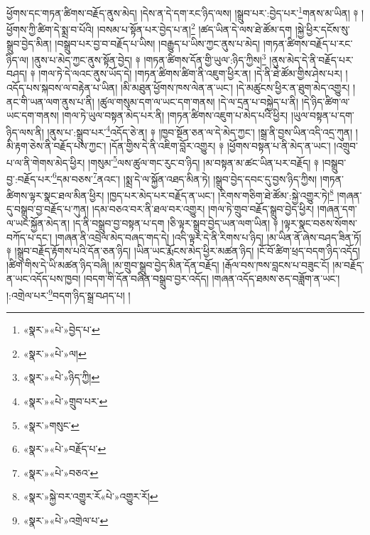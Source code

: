 ཕྱོགས་དང་གཏན་ཚིགས་བརྗོད་ནུས་མེད། །དེས་ན་དེ་དག་རང་ཉིད་ལས། །སྒྲུབ་པར་:བྱེད་པར་\footnote{«སྣར་»«པེ་»བྱེད་པ་}གནས་མ་ཡིན། ༈ །ཕྱོགས་ཀྱི་ཚིག་དེ་སྨྲ་བ་པོའི། །བསམ་པ་སྟོན་པར་བྱེད་པ་ན།\footnote{«སྣར་»«པེ་»ལ།} །ཚད་ཡིན་དེ་ལས་ཐེ་ཚོམ་དག །སྐྱེ་ཕྱིར་དངོས་སུ་སྒྲུབ་བྱེད་མིན། །བསྒྲུབ་པར་བྱ་བ་བརྗོད་པ་ཡིས། །བརྒྱུད་པ་ཡིས་ཀྱང་ནུས་པ་མེད། །གཏན་ཚིགས་བརྗོད་པ་རང་ཉིད་ལ། །ནུས་པ་མེད་ཀྱང་ནུས་སྟོན་བྱེད། ༈ །གཏན་ཚིགས་དོན་གྱི་ཡུལ་:ཉིད་ཀྱིས།\footnote{«སྣར་»«པེ་»ཉིད་ཀྱི།} །ནུས་མེད་དེ་ནི་བརྗོད་པར་བཤད། ༈ །གལ་ཏེ་དེ་ལའང་ནུས་ཡོད་དེ། །གཏན་ཚིགས་ཚིག་ནི་འཇུག་ཕྱིར་ན། །དེ་ནི་ཐེ་ཚོམ་གྱིས་ཤེས་པར། །འདོད་པས་སྐབས་ལ་བརྟེན་པ་ཡིན། །མི་མཐུན་ཕྱོགས་ཁས་ལེན་ན་ཡང་། །དེ་མཚུངས་ཕྱིར་ན་ཐུག་མེད་འགྱུར། །ནང་གི་ཡན་ལག་ནུས་པ་ནི། །ཚུལ་གསུམ་དག་ལ་ཡང་དག་གནས། །དེ་ལ་དྲན་པ་བསྐྱེད་པ་ནི། །དེ་ཉིད་ཚིག་ལ་ཡང་དག་གནས། །གལ་ཏེ་ཡུལ་བསྟན་མེད་པར་ནི། །གཏན་ཚིགས་འཇུག་པ་མེད་པའི་ཕྱིར། །ཡུལ་བསྟན་པ་དག་ཉིད་ལས་ནི། །ནུས་པ་:སྒྲུབ་པར་\footnote{«སྣར་»«པེ་»གྲུབ་པར་}འདོད་ཅེ་ན། ༈ །ཁྱབ་སྔོན་ཅན་ལ་དེ་མེད་ཀྱང་། །སྒྲ་ནི་བྱས་ཡིན་འདི་འདྲ་ཀུན། །མི་རྟག་ཅེས་ནི་བརྗོད་པས་ཀྱང་། །དོན་གྱིས་དེ་ནི་འཇིག་བློར་འགྱུར། ༈ །ཕྱོགས་བསྟན་པ་ནི་མེད་ན་ཡང་། །འགྲུབ་པ་ལ་ནི་གེགས་མེད་ཕྱིར། །གསུམ་\footnote{«སྣར་»གསུང་}ལས་ཚུལ་གང་རུང་བ་ཉིད། །མ་བསྟན་མ་ཚང་ཡིན་པར་བརྗོད། ༈ །བསྒྲུབ་བྱ་:བརྗོད་པར་\footnote{«སྣར་»«པེ་»བརྗོད་པ་}དམ་བཅས་\footnote{«སྣར་»«པེ་»བཅའ་}ནའང་། །སྨྲ་དེ་ལ་སྐྱོན་འཐད་མིན་ཏེ། །སྒྲུབ་བྱེད་དབང་དུ་བྱས་ཉིད་ཀྱིས། །གཏན་ཚིགས་ལྟར་སྣང་ཐལ་མིན་ཕྱིར། །ཁྱད་པར་མེད་པར་བརྗོད་ན་ཡང་། །རིགས་གཅིག་ཐེ་ཚོམ་:སྐྱེ་འགྱུར་ཏེ།\footnote{«སྣར་»སྐྱེ་བར་འགྱུར་རོ«པེ་»འགྱུར་རོ།} །གཞན་དུ་བསྒྲུབ་བྱ་བརྗོད་པ་ཀུན། །དམ་བཅའ་བར་ནི་ཐལ་བར་འགྱུར། །གལ་ཏེ་གྲུབ་བརྗོད་སྒྲུབ་བྱེད་ཕྱིར། །གཞན་དག་ལ་ཡང་སྐྱོན་མེད་ན། །ད་ནི་བསྒྲུབ་བྱ་བསྟན་པ་དག །ཅི་ལྟར་སྒྲུབ་བྱེད་ཡན་ལག་ཡིན། ༈ །ལྟར་སྣང་བཅས་སོགས་བཀོད་པ་དང་། །གཞན་ནི་འབྲེལ་མེད་བཞད་གད་དེ། །འདི་ལྟར་དེ་ནི་རིགས་པ་ཉིད། །མ་ཡིན་ནོ་ཞེས་བཤད་ཟིན་ཏོ། ༈ །སྒྲུབ་བརྗོད་རྟོགས་པའི་དོན་ཅན་ཉིད། །ཡིན་ཡང་རྨོངས་མེད་ཕྱིར་མཚན་ཉིད། །ངོ་བོ་ཚིག་ཕྲད་བདག་ཉིད་འདོད། །ཚིག་གིས་དེ་ཡི་མཚན་ཉིད་བཞི། །མ་གྲུབ་སྒྲུབ་བྱེད་མིན་དོན་བརྗོད། །རྒོལ་བས་ཁས་བླངས་པ་བཟུང་ངོ། །མ་བརྗོད་ན་ཡང་འདོད་པས་ཁྱབ། །བདག་གི་དོན་བཞིན་བསྒྲུབ་བྱར་འདོད། །གཞན་འདོད་ཐམས་ཅད་བཟློག་ན་ཡང་། །:འགྲེལ་པར་\footnote{«སྣར་»«པེ་»འགྲེལ་པ་}བདག་ཉིད་སྒྲ་བཤད་པ། །
